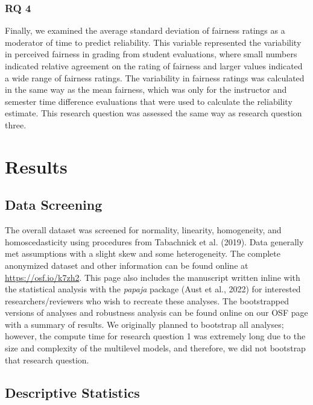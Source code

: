 \documentclass[
  man]{apa7}
\begin{document}
\hypertarget{rq-4}{%
\subsubsection{RQ 4}\label{rq-4}}

Finally, we examined the average standard deviation of fairness ratings
as a moderator of time to predict reliability. This variable represented
the variability in perceived fairness in grading from student
evaluations, where small numbers indicated relative agreement on the
rating of fairness and larger values indicated a wide range of fairness
ratings. The variability in fairness ratings was calculated in the same
way as the mean fairness, which was only for the instructor and semester
time difference evaluations that were used to calculate the reliability
estimate. This research question was assessed the same way as research
question three.

\hypertarget{results}{%
\section{Results}\label{results}}

\hypertarget{data-screening}{%
\subsection{Data Screening}\label{data-screening}}

The overall dataset was screened for normality, linearity, homogeneity,
and homoscedasticity using procedures from Tabachnick et al. (2019). Data
generally met assumptions with a slight skew and some heterogeneity. The
complete anonymized dataset and other information can be found online at
\url{https://osf.io/k7zh2}. This page also includes the manuscript written
inline with the statistical analysis with the \emph{papaja} package
(Aust et al., 2022) for interested researchers/reviewers who wish to recreate
these analyses. The bootstrapped versions of analyses and robustness
analysis can be found online on our OSF page with a summary of results.
We originally planned to bootstrap all analyses; however, the compute
time for research question 1 was extremely long due to the size and
complexity of the multilevel models, and therefore, we did not bootstrap
that research question.

\hypertarget{descriptive-statistics}{%
\subsection{Descriptive Statistics}\label{descriptive-statistics}}
\end{document}
